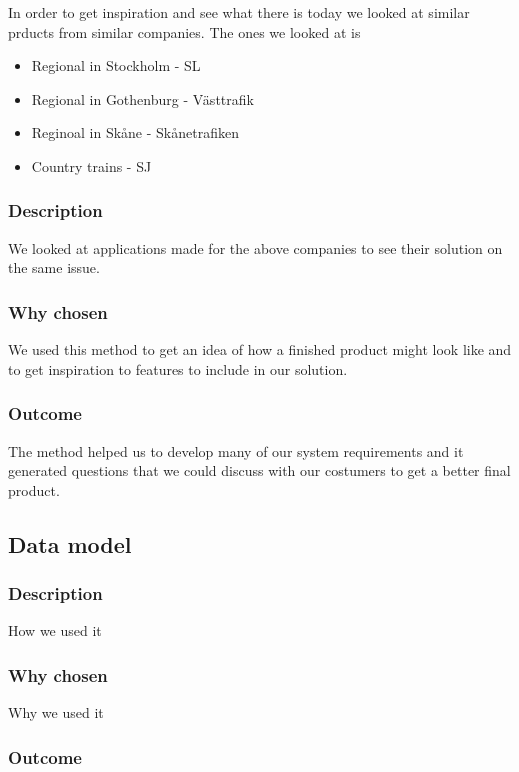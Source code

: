 \documentclass[a4paper]{article}
\begin{document}
    In order to get inspiration and see what there is today we looked at similar prducts from similar companies.
    The ones we looked at is

	\begin{itemize}
		\item Regional in Stockholm - SL
		\item Regional in Gothenburg - Västtrafik
		\item Reginoal in Skåne - Skånetrafiken
		\item Country trains - SJ
	\end{itemize}
    
    

    \subsubsection{Description}
    We looked at applications made for the above companies to see their solution on the same issue.
    \subsubsection{Why chosen}
    We used this method to get an idea of how a finished product might look like and to get inspiration to features to include in our solution.
    \subsubsection{Outcome}
    The method helped us to develop many of our system requirements and it generated questions that we could discuss with our costumers to get a better final product. 

    \subsection{Data model}
		
    \subsubsection{Description}
    How we used it
    \subsubsection{Why chosen}
    Why we used it
    \subsubsection{Outcome}
\end{document}
